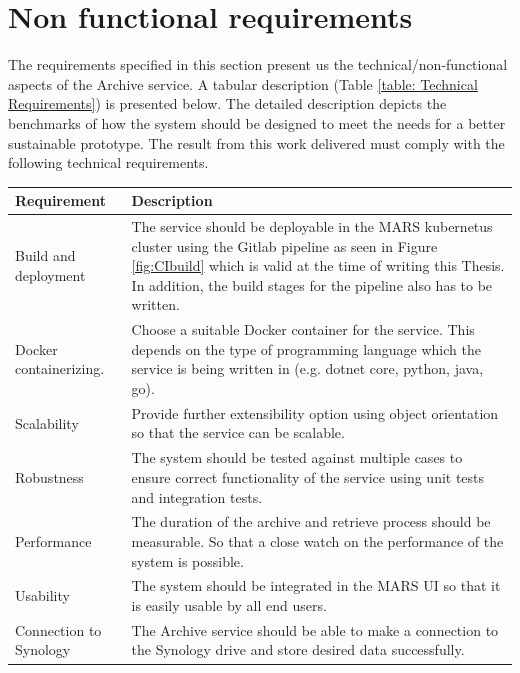 \section{Non functional requirements}
\label{section:technicalReq}
The requirements specified in this section present us the technical/non-functional aspects of the Archive service. A tabular description 
(Table \ref{table: Technical Requirements}) is presented below.
The detailed description depicts the benchmarks of how the system should be designed to meet the needs for a better sustainable prototype.
The result from this work delivered must comply with the following technical requirements.

    \begin{longtable}{|p{3cm}|p{12cm}|}
            \hline
                \textbf{Requirement}  & \textbf{Description}\\
            \hline
                 Build and deployment & 
                 The service should be deployable in the MARS kubernetus \cite{kubernetes} cluster using the Gitlab pipeline as seen in Figure \ref{fig:CIbuild}
                 which is valid at the time of writing this Thesis. In addition,
                 the build stages for the pipeline also has to be written. \\
            \hline
                Docker containerizing.
                & Choose a suitable Docker container \cite[p.~7 - 8]{Torre2017} for the service. This depends on the type of programming language which 
                the service is being
                written in (e.g. dotnet core, python, java, go).\\
            \hline
                 Scalability & Provide further extensibility option using object orientation so that the service can be scalable.\\
            \hline
                 Robustness & The system should be tested against multiple cases to ensure correct functionality of the service using unit tests and
                 integration tests.\\    
            \hline
                 Performance & The duration of the archive and retrieve process should be measurable. So that a close watch on the performance of the system is 
                 possible. \\    
            \hline
                 Usability & The system should be integrated in the MARS UI so that it is easily usable by all end users.\\    
            \hline
                 Connection to Synology & The Archive service should be able to make a connection to the Synology drive and store desired data successfully.\\ 

\end{longtable}
